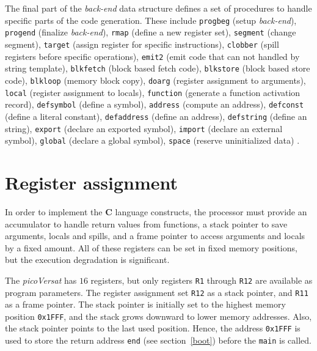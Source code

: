 The final part of the {\it back-end} data structure
defines a set of procedures to handle
specific parts of the code generation.
These include {\tt progbeg} (setup {\it back-end}),
{\tt progend} (finalize {\it back-end}),
{\tt rmap} (define a new register set),
{\tt segment} (change segment),
{\tt target} (assign register for specific instructions),
{\tt clobber} (spill registers before specific operations),
{\tt emit2} (emit code that can not handled by string template),
{\tt blkfetch} (block based fetch code),
{\tt blkstore} (block based store code),
{\tt blkloop} (memory block copy),
{\tt doarg} (register assignment to arguments),
{\tt local} (register assignment to locals),
{\tt function} (generate a function activation record),
{\tt defsymbol} (define a symbol),
{\tt  address} (compute an address),
{\tt defconst} (define a literal constant),
{\tt defaddress} (define an address),
{\tt defstring} (define an string),
{\tt export} (declare an exported symbol),
{\tt import} (declare an external symbol),
{\tt global} (declare a global symbol),
{\tt space} (reserve uninitialized data)
\cite[p.79]{hanson95}.

\section{Register assignment}

In order to implement the {\bf C} language constructs,
the processor must provide an accumulator to handle
return values from functions, a stack pointer to save
arguments, locals and spills, and a frame pointer to
access arguments and locals by a fixed amount.
All of these registers can be set in fixed memory positions,
but the execution degradation is significant.


The {\it picoVersat} has $16$ registers, but only registers
{\tt R1} through {\tt R12} are available as program
parameters.
The register assignment set {\tt R12} as a stack pointer, and
{\tt R11} as a frame pointer.
The stack pointer is initially set to the highest memory position
{\tt 0x1FFF}, and the stack grows downward to lower memory addresses.
Also, the stack pointer points to the last used position.
Hence, the address {\tt 0x1FFF} is used to store the
return address {\tt end} (see section~\ref{boot})
before the {\tt main} is called.

